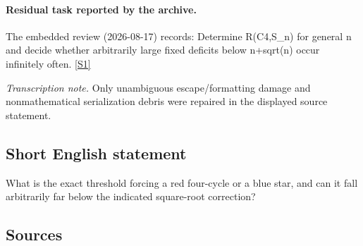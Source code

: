 \documentclass[11pt,a4paper]{article}
\newcommand{\sref}[2]{\hyperlink{source:#1:#2}{[S#2]}}
\begin{document}
\paragraph{Residual task reported by the archive.}

The embedded review (2026-08-17) records: Determine R(C4,S\_n) for general n and decide whether arbitrarily large fixed deficits below n+sqrt(n) occur infinitely often. \sref{statement}{1}

{\small\emph{Transcription note.} Only unambiguous escape/formatting damage and nonmathematical serialization debris were repaired in the displayed source statement.}

\subsection{Short English statement}

What is the exact threshold forcing a red four-cycle or a blue star, and can it fall arbitrarily far below the indicated square-root correction?

\subsection{Sources}
\end{document}
